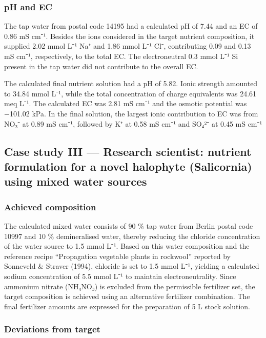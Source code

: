 \documentclass[
  letterpaper,
  DIV=11,
  numbers=noendperiod]{scrreprt}
\begin{document}
\subsubsection{pH and EC}\label{ph-and-ec-1}

The tap water from postal code 14195 had a calculated pH of 7.44 and an
EC of 0.86 mS cm⁻¹. Besides the ions considered in the target nutrient
composition, it supplied 2.02 mmol L⁻¹ Na⁺ and 1.86 mmol L⁻¹ Cl⁻,
contributing 0.09 and 0.13 mS cm⁻¹, respectively, to the total EC. The
electroneutral 0.3 mmol L⁻¹ Si present in the tap water did not
contribute to the overall EC.

The calculated final nutrient solution had a pH of 5.82. Ionic strength
amounted to 34.84 mmol L⁻¹, while the total concentration of charge
equivalents was 24.61 meq L⁻¹. The calculated EC was 2.81 mS cm⁻¹ and
the osmotic potential was −101.02 kPa. In the final solution, the
largest ionic contribution to EC was from NO₃⁻ at 0.89 mS cm⁻¹, followed
by K⁺ at 0.58 mS cm⁻¹ and SO₄²⁻ at 0.45 mS cm⁻¹

\subsection{Case study III --- Research scientist: nutrient formulation
for a novel halophyte (Salicornia) using mixed water
sources}\label{case-study-iii-research-scientist-nutrient-formulation-for-a-novel-halophyte-salicornia-using-mixed-water-sources}

\subsubsection{Achieved composition}\label{achieved-composition-2}

The calculated mixed water consists of 90 \% tap water from Berlin
postal code 10997 and 10 \% demineralised water, thereby reducing the
chloride concentration of the water source to 1.5 mmol L⁻¹. Based on
this water composition and the reference recipe ``Propagation vegetable
plants in rockwool'' reported by Sonneveld \& Straver (1994), chloride
is set to 1.5 mmol L⁻¹, yielding a calculated sodium concentration of
5.5 mmol L⁻¹ to maintain electroneutrality. Since ammonium nitrate
(NH₄NO₃) is excluded from the permissible fertilizer set, the target
composition is achieved using an alternative fertilizer combination. The
final fertilizer amounts are expressed for the preparation of 5 L stock
solution.

\subsubsection{Deviations from target}\label{deviations-from-target-2}
\end{document}
